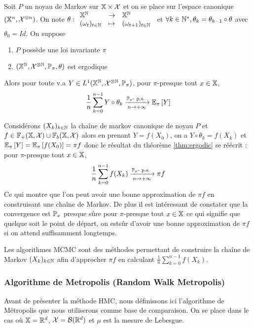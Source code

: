 \documentclass[10pt,a4paper]{article}
\begin{document}
\begin{Thm}\label{thm:ergodic}
  Soit $P$ un noyau de Markov sur $\mathbb{X} \times \mathcal{X}$ et on se place sur l'espace canonique $(\mathbb{X}^n, \mathcal{X}^{\otimes n})$. On note $ \theta : { \begin{array}{lcl}  \mathbb{X}^{\mathbb{N}} &\to& \mathbb{X}^{\mathbb{N}} \\ (\omega_t)_{t\in \mathbb{N}} &\mapsto& (\omega_{t+1})_{t \in \mathbb{N}} \end{array} }$ et  $\forall k \in \mathbb{N}^*, \theta_k = \theta_{k-1} \circ \theta$ avec $\theta_0 = Id$. On suppose
  \begin{enumerate}
  \item $P$ possède une loi invariante $\pi$
  \item $(\xset^\nset, \calX^{\otimes \nset}, \PP_\pi, \theta)$ est ergodique
  \end{enumerate}
  Alors pour toute v.a $Y \in L^1(\xset^\nset, \calX^{\otimes \nset}, \PP_\pi)$, pour $\pi$-presque tout $x \in \mathbb{X}$, 
$$
  \frac{1}{n} \sum_{k=0}^{n-1} Y \circ \theta_k \xrightarrow[n \to +\infty]{\PP_x\text{-}\ps} \EE{\pi}[Y]
  $$
\end{Thm}

\begin{Rque}
  Considérons $(X_k)_{k \in \mathbb{N}}$ la chaîne de markov canonique de noyau $P$ et $f \in \mathbb{F}_+(\mathbb{X}, \mathcal{X}) \cup \mathbb{F}_b(\mathbb{X}, \mathcal{X})$ alors en prenant $Y = f(X_0)$, on a $Y \circ \theta_k = f(X_k)$ et $\EE{\pi}[Y] = \EE{\pi}[f(X_0)] = \pi f$ donc le résultat du théorème \ref{thm:ergodic} se réécrit : pour $\pi$-presque tout $x \in \mathbb{X}$, 
$$
  \frac{1}{n} \sum_{k=0}^{n-1} f(X_k) \xrightarrow[n \to +\infty]{\PP_x\text{-}\ps} \pi f
  $$
  Ce qui montre que l'on peut avoir une bonne approximation de $\pi f$ en construisant une chaîne de Markov. De plus il est intéressant de constater que la convergence est $\PP_x$ presque sûre pour $\pi$-presque tout $x \in \mathbb{X}$ ce qui signifie que quelque soit le point de départ, on estsûr d'avoir une bonne approximation de $\pi f$ si on attend suffisamment longtemps.
\end{Rque}
Les algorithmes MCMC sont des méthodes permettant de construire la chaîne de Markov $(X_k)_{k \in \mathbb{N}}$ afin d'approcher $\pi f$ en calculant $\frac{1}{n} \sum_{k=0}^{n-1} f(X_k)$. 

\subsubsection{Algorithme de Metropolis (Random Walk Metropolis)}
Avant de présenter la méthode HMC, nous définissons ici l'algorithme de Métropolis que nous utiliserons comme base de comparaison. On se place dans le cas où $\mathbb{X} = \mathbb{R}^d$, $\mathcal{X} = \mathcal{B}(\mathbb{R}^d)$ et $\mu$ est la mesure de Lebesgue. 
\end{document}
